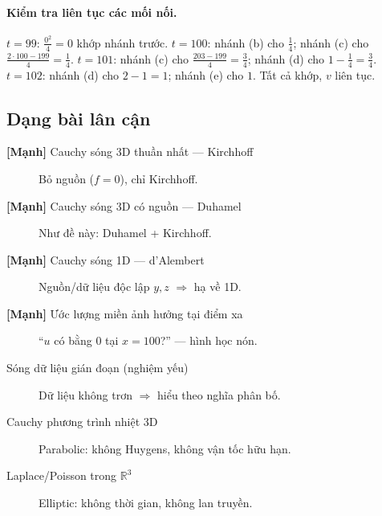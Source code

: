 \paragraph{Kiểm tra liên tục các mối nối.}
$t=99$: $\tfrac{0^2}{4}=0$ khớp nhánh trước. $t=100$: nhánh (b) cho $\tfrac{1}{4}$; nhánh (c) cho $\tfrac{2\cdot100-199}{4}=\tfrac14$. $t=101$: nhánh (c) cho $\tfrac{203-199}{4}=\tfrac34$; nhánh (d) cho $1-\tfrac14=\tfrac34$. $t=102$: nhánh (d) cho $2-1=1$; nhánh (e) cho $1$. Tất cả khớp, $v$ liên tục.

\subsection*{Dạng bài lân cận}
\begin{description}
  \item[\textbf{[Mạnh]} Cauchy sóng 3D thuần nhất --- Kirchhoff] Bỏ nguồn ($f=0$), chỉ Kirchhoff.
  \item[\textbf{[Mạnh]} Cauchy sóng 3D có nguồn --- Duhamel] Như đề này: Duhamel + Kirchhoff.
  \item[\textbf{[Mạnh]} Cauchy sóng 1D --- d'Alembert] Nguồn/dữ liệu độc lập $y,z$ $\Rightarrow$ hạ về 1D.
  \item[\textbf{[Mạnh]} Ước lượng miền ảnh hưởng tại điểm xa] ``$u$ có bằng 0 tại $x=100$?'' --- hình học nón.
  \item[Sóng dữ liệu gián đoạn (nghiệm yếu)] Dữ liệu không trơn $\Rightarrow$ hiểu theo nghĩa phân bố.
  \item[Cauchy phương trình nhiệt 3D] Parabolic: không Huygens, không vận tốc hữu hạn.
  \item[Laplace/Poisson trong $\mathbb{R}^3$] Elliptic: không thời gian, không lan truyền.
\end{description}
